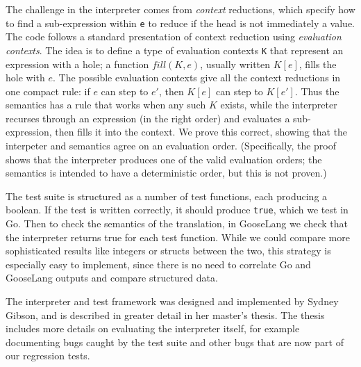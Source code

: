 The challenge in the interpreter comes from \emph{context} reductions,
which specify how to find a sub-expression within \texttt{e} to reduce
if the head is not immediately a value. The code follows a standard
presentation of context reduction using \emph{evaluation contexts}. The
idea is to define a type of evaluation contexts \texttt{K} that
represent an expression with a hole; a function \(fill(K, e)\), usually
written \(K[e]\), fills the hole with \(e\). The possible evaluation
contexts give all the context reductions in one compact rule: if \(e\)
can step to \(e'\), then \(K[e]\) can step to \(K[e']\). Thus the
semantics has a rule that works when any such \(K\) exists, while the
interpreter recurses through an expression (in the right order) and
evaluates a sub-expression, then fills it into the context. We prove
this correct, showing that the interpeter and semantics agree on an
evaluation order. (Specifically, the proof shows that the interpreter
produces one of the valid evaluation orders; the semantics is intended
to have a deterministic order, but this is not proven.)

The test suite is structured as a number of test functions, each
producing a boolean. If the test is written correctly, it should produce
\texttt{true}, which we test in Go. Then to check the semantics of the
translation, in GooseLang we check that the interpreter returns true for
each test function. While we could compare more sophisticated results
like integers or structs between the two, this strategy is especially
easy to implement, since there is no need to correlate Go and GooseLang
outputs and compare structured data.

The interpreter and test framework was designed and implemented by
Sydney Gibson, and is described in greater detail in her master's
thesis. The thesis includes more details on evaluating the interpreter
itself, for example documenting bugs caught by the test suite and other
bugs that are now part of our regression tests.
